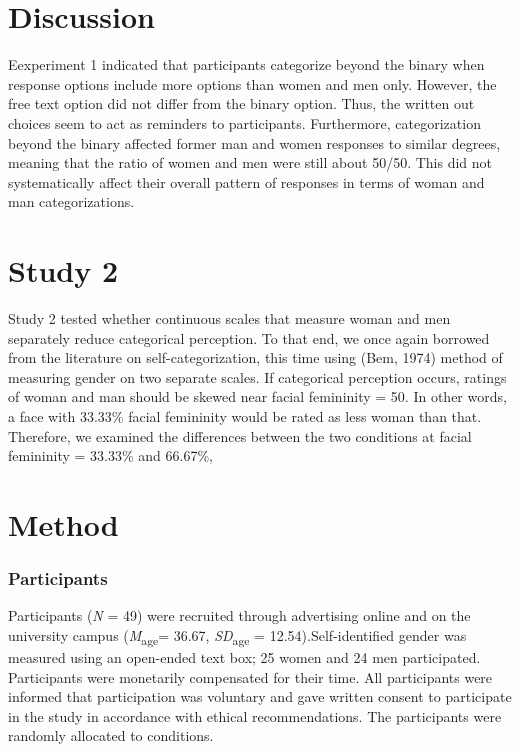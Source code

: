 \documentclass[
  man]{apa7}
\begin{document}
\hypertarget{discussion}{%
\section{Discussion}\label{discussion}}

Eexperiment 1 indicated that participants categorize beyond the binary when response options include more options than women and men only. However, the free text option did not differ from the binary option. Thus, the written out choices seem to act as reminders to participants. Furthermore, categorization beyond the binary affected former man and women responses to similar degrees, meaning that the ratio of women and men were still about 50/50. This did not systematically affect their overall pattern of responses in terms of woman and man categorizations.

\hypertarget{study-2}{%
\section{Study 2}\label{study-2}}

Study 2 tested whether continuous scales that measure woman and men separately reduce categorical perception. To that end, we once again borrowed from the literature on self-categorization, this time using (Bem, 1974) method of measuring gender on two separate scales.
If categorical perception occurs, ratings of woman and man should be skewed near facial femininity = 50. In other words, a face with 33.33\% facial femininity would be rated as less woman than that. Therefore, we examined the differences between the two conditions at facial femininity = 33.33\% and 66.67\%,

\hypertarget{method-1}{%
\section{Method}\label{method-1}}

\hypertarget{participants-1}{%
\subsubsection{Participants}\label{participants-1}}

Participants (\emph{N} = 49) were recruited through advertising online and on the university campus (\emph{M}\textsubscript{age}= 36.67, \emph{SD}\textsubscript{age} = 12.54).Self-identified gender was measured using an open-ended text box; 25 women and 24 men participated. Participants were monetarily compensated for their time. All participants were informed that participation was voluntary and gave written consent to participate in the study in accordance with ethical recommendations. The participants were randomly allocated to conditions.
\end{document}
